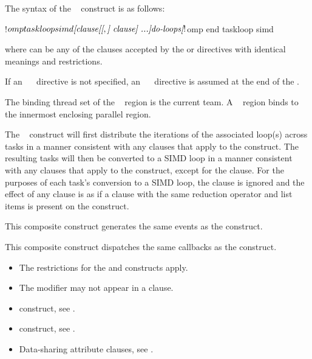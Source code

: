 \begin{fortranspecific}
The syntax of the ~ construct is as follows:
\begin{ompfPragma}
!$omp taskloop simd \plc{[clause[[},\plc{] clause] ...]}
    \plc{do-loops}
\plc{[}!$omp end taskloop simd\plc{]}
\end{ompfPragma}
where  can be any of the clauses accepted by the  
or  directives with identical meanings and restrictions.

If an ~~ directive is not specified, an 
~~ directive is assumed at the end of 
the .
\end{fortranspecific}

\binding
The binding thread set of the ~ region is the current 
team. A ~ region binds to the innermost enclosing 
parallel region.

\descr
The ~ construct will first distribute the iterations 
of the associated loop(s) across tasks in a manner consistent with any clauses 
that apply to the  construct. The resulting tasks will then be 
converted to a SIMD loop in a manner consistent with any clauses that apply to 
the  construct, except for the  clause. For the purposes 
of each task's conversion to a SIMD loop, the  clause is ignored 
and the effect of any  clause is as if a  
clause with the same reduction operator and list items is present on the construct.

\events

This composite construct generates the same events as the  construct.

\tools

This composite construct dispatches the same callbacks as the  construct.

\restrictions
\begin{itemize}
\item The restrictions for the  and  constructs apply.
\item The  modifier may not appear in a  clause.
\end{itemize}

\crossreferences
\begin{itemize}
\item {} construct, see .

\item {} construct, see .

\item Data-sharing attribute clauses, see 
.
\end{itemize}



